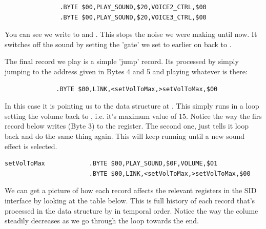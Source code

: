 \begin{lstlisting}
               .BYTE $00,PLAY_SOUND,$20,VOICE2_CTRL,$00
               .BYTE $00,PLAY_SOUND,$20,VOICE3_CTRL,$00
\end{lstlisting}

You can see we write  to  and . This stops the noise we were making
until now. It switches off the sound by setting the 'gate' we set to  earlier on back to .

The final record we play is a simple 'jump' record. Its processed by simply jumping to the address given in Bytes 4 and
5 and playing whatever is there:

\begin{lstlisting}
              .BYTE $00,LINK,<setVolToMax,>setVolToMax,$00
\end{lstlisting}

In this case it is pointing us to the data structure at . This simply runs in a loop setting the volume
back to , i.e. it's maximum value of 15. Notice the way the firs record below writes  (Byte 3) to the
 register. The second one, just tells it loop back and do the same thing again. This will keep running until
a new sound effect is selected.

\begin{lstlisting}
setVolToMax            .BYTE $00,PLAY_SOUND,$0F,VOLUME,$01
                       .BYTE $00,LINK,<setVolToMax,>setVolToMax,$00
\end{lstlisting}

We can get a picture of how each record affects the relevant registers in the SID interface by looking at the table below.
This is full history of each record that's processed in the  data structure by 
in temporal order. Notice the way the colume steadily decreases as we go through the  loop towards the end.

